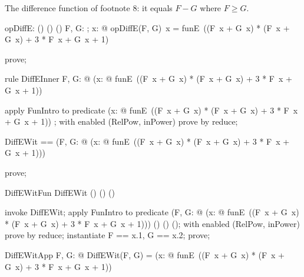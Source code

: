 \documentclass{article}
\begin{document}
The difference function of footnote 8: it equals $F - G$ where $F \ge G$.

\begin{axdef}
  opDiffE: (\nat \fun \nat) \cross (\nat \fun \nat) \fun (\nat \fun \nat)
\where
   \forall F, G: \nat \fun \nat; x: \nat @ opDiffE(F, G)~x = funE~((F~x + G~x) * (F~x + G~x) + 3 * F~x + G~x + 1)
\end{axdef}

\begin{zproof}
prove;
\end{zproof}

\begin{theorem}{rule DiffEInner}
  \forall F, G: \nat \fun \nat @ (\lambda x: \nat @ funE~((F~x + G~x) * (F~x + G~x) + 3 * F~x + G~x + 1)) \in \nat \fun \nat
\end{theorem}

\begin{zproof}
apply FunIntro to predicate (\lambda x: \nat @ funE~((F~x + G~x) * (F~x + G~x) + 3 * F~x + G~x + 1)) \in \nat \fun \nat;
with enabled (RelPow, inPower) prove by reduce;
\end{zproof}

\begin{zed}
  DiffEWit == (\lambda F, G: \nat \fun \nat @ (\lambda x: \nat @ funE~((F~x + G~x) * (F~x + G~x) + 3 * F~x + G~x + 1)))
\end{zed}

\begin{zproof}
prove;
\end{zproof}

\begin{theorem}{DiffEWitFun}
  DiffEWit \in (\nat \fun \nat) \cross (\nat \fun \nat) \fun (\nat \fun \nat)
\end{theorem}

\begin{zproof}
invoke DiffEWit;
apply FunIntro to predicate (\lambda F, G: \nat \fun \nat @ (\lambda x: \nat @ funE~((F~x + G~x) * (F~x + G~x) + 3 * F~x + G~x + 1))) \in (\nat \fun \nat) \cross (\nat \fun \nat) \fun (\nat \fun \nat);
with enabled (RelPow, inPower) prove by reduce;
instantiate F == x.1, G == x.2;
prove;
\end{zproof}

\begin{theorem}{DiffEWitApp}
  \forall F, G: \nat \fun \nat @ DiffEWit(F, G) = (\lambda x: \nat @ funE~((F~x + G~x) * (F~x + G~x) + 3 * F~x + G~x + 1))
\end{theorem}
\end{document}
